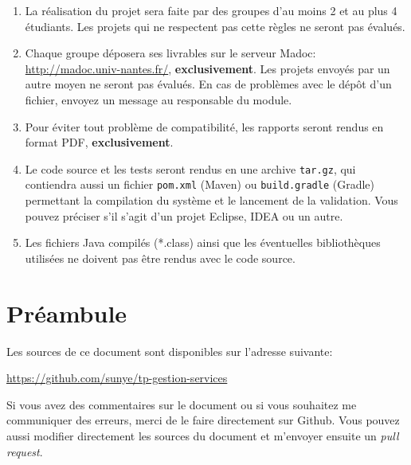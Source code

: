 \documentclass[a4]{report}
\begin{document}
\begin{enumerate}
	\item La réalisation du projet sera faite par des groupes d'au moins 2 et au plus 4 étudiants.
	Les projets qui ne respectent pas cette règles ne seront pas évalués.

	\item Chaque groupe déposera ses livrables sur le serveur Madoc: \url{http://madoc.univ-nantes.fr/}, \textbf{exclusivement}.
	Les projets envoyés par un autre moyen ne seront pas évalués.
	En cas de problèmes avec le dépôt d'un fichier, envoyez un message au responsable du module.
	
	\item Pour éviter tout problème de compatibilité, les rapports seront rendus en format PDF, \textbf{exclusivement}.
	
	\item Le code source et les tests seront rendus en une archive \texttt{tar.gz}, qui contiendra aussi un fichier \texttt{pom.xml} (Maven) ou \texttt{build.gradle} (Gradle) permettant la compilation du système et le lancement de la validation. Vous pouvez préciser s'il s'agit d'un projet Eclipse, IDEA ou un autre.
	
	\item Les fichiers Java compilés (*.class) ainsi que les éventuelles bibliothèques utilisées ne doivent pas être rendus avec le code source.
\end{enumerate}

\section{Préambule}

Les sources de ce document sont disponibles sur l'adresse suivante:

\url{https://github.com/sunye/tp-gestion-services}

Si vous avez des commentaires sur le document ou si vous souhaitez me communiquer des erreurs, merci de le faire directement sur Github.
Vous pouvez aussi modifier directement les sources du document et m'envoyer ensuite un \emph{pull request}.












 
\end{document}
